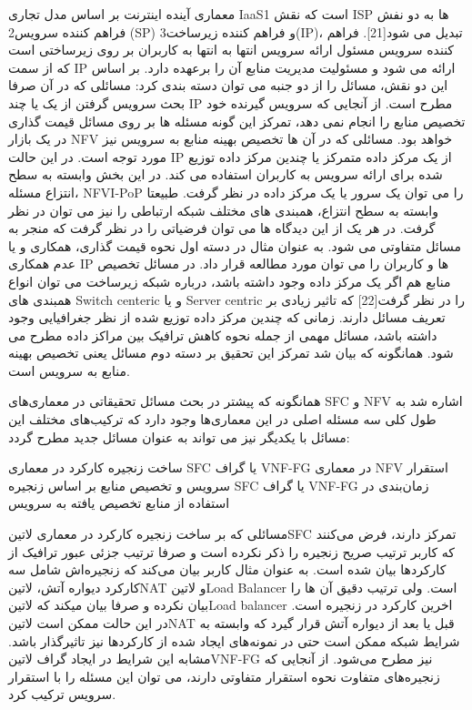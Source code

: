 معماری آینده اینترنت بر اساس مدل تجاری IaaS1 است که نقش ISP ها به دو نفش فراهم کننده سرویس2 (SP) و فراهم کننده زیرساخت3(IP)، تبدیل می شود[21]. فراهم کننده سرویس مسئول ارائه سرویس انتها به انتها به کاربران بر روی زیرساختی است که از سمت IP ارائه می شود و مسئولیت مدیریت منابع آن را برعهده دارد. بر اساس این دو نقش، مسائل را از دو جنبه می توان دسته بندی کرد:
 مسائلی که در آن صرفا بحث سرویس گرفتن از یک یا چند IP مطرح است. از آنجایی که سرویس گیرنده خود تخصیص منابع را انجام نمی دهد، تمرکز این گونه مسئله ها بر روی مسائل قیمت گذاری در یک بازار NFV خواهد بود.
 مسائلی که در آن ها تخصیص بهینه منابع به سرویس نیز مورد توجه است. در این حالت IP از یک مرکز داده متمرکز یا چندین مرکز داده توزیع شده برای ارائه سرویس به کاربران استفاده می کند.  در این بخش وابسته به سطح  انتزاع مسئله، NFVI-PoP را می توان یک سرور یا یک مرکز داده در نظر گرفت. طبیعتا وابسته به سطح انتزاع، همبندی های مختلف شبکه ارتباطی را نیز می توان در نظر گرفت.
در هر یک از این دیدگاه ها می توان فرضیاتی را در نظر گرفت که منجر به مسائل متفاوتی می شود. به عنوان مثال در دسته اول نحوه قیمت گذاری، همکاری و یا عدم همکاری IP ها و کاربران را می توان مورد مطالعه قرار داد. در مسائل تخصیص منابع هم اگر یک مرکز داده وجود داشته باشد، درباره شبکه زیرساخت می توان انواع همبندی های Switch centeric و یا Server centric را در نظر گرفت[22] که تاثیر زیادی بر تعریف مسائل دارند. زمانی که چندین مرکز داده توزیع شده از نظر جغرافیایی وجود داشته باشد، مسائل مهمی از جمله نحوه کاهش ترافیک بین مراکز داده مطرح می شود. همانگونه که بیان شد تمرکز این تحقیق بر دسته دوم مسائل یعنی تخصیص بهینه منابع به سرویس است.



همانگونه که پیشتر در بحث مسائل تحقیقاتی در معماری‌های SFC و NFV اشاره شد به طول کلی سه مسئله اصلی در این معماری‌ها وجود دارد که ترکیب‌های مختلف این مسائل با یکدیگر نیز می تواند به عنوان مسائل جدید مطرح گردد:

 ساخت زنجیره کارکرد در معماری SFC یا گراف VNF-FG در معماری NFV
 استقرار سرویس و تخصیص منابع بر اساس زنجیره SFC یا گراف VNF-FG
 زمان‌بندی در استفاده از منابع تخصیص یافته به سرویس

مسائلی که بر ساخت زنجیره کارکرد در معماری ‌لاتین{SFC} تمرکز دارند، فرض می‌کنند که کاربر ترتیب صریح زنجیره را ذکر نکرده است و صرفا ترتیب جزئی عبور ترافیک از کارکردها بیان شده است.
به عنوان مثال کاربر بیان می‌کند که زنجیره‌اش شامل سه کارکرد دیواره آتش، ‌لاتین{NAT} و ‌لاتین{Load Balancer} است. ولی ترتیب دقیق آن ها را بیان نکرده و صرفا بیان میکند که ‌لاتین{Load balancer} اخرین کارکرد در زنجیره است.
در این حالت ممکن است ‌لاتین{NAT} قبل یا بعد از دیواره آتش قرار گیرد که وابسته به شرایط شبکه ممکن است حتی در نمونه‌های ایجاد شده از کارکردها نیز تاثیرگذار باشد.
مشابه این شرایط در ایجاد گراف ‌لاتین{VNF-FG} نیز مطرح می‌شود. از آنجایی که زنجیره‌های متفاوت نحوه استقرار متفاوتی دارند، می توان این مسئله را با استقرار سرویس ترکیب کرد.

